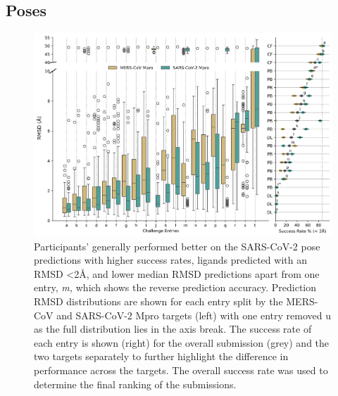 \documentclass[journal=jcim,manuscript=article]{achemso}
\begin{document}
\subsection{Poses}

\begin{figure}
    \includegraphics[scale=0.15
    ]{04_figs_leaderboards/pose_comp.png}
  \caption{Participants' generally performed better on the SARS-CoV-2 pose predictions with higher success rates, ligands predicted with an RMSD \textless2Å, and lower median RMSD predictions apart from one entry, \textit{m,} which shows the reverse prediction accuracy. Prediction RMSD distributions are shown for each entry split by the MERS-CoV and SARS-CoV-2 Mpro targets (left) with one entry removed u as the full distribution lies in the axis break. The success rate of each entry is shown (right) for the overall submission (grey) and the two targets separately to further highlight the difference in performance across the targets. The overall success rate was used to determine the final ranking of the submissions.}
  \label{fgr:poses_leaderboard}
\end{figure}

\end{document}
